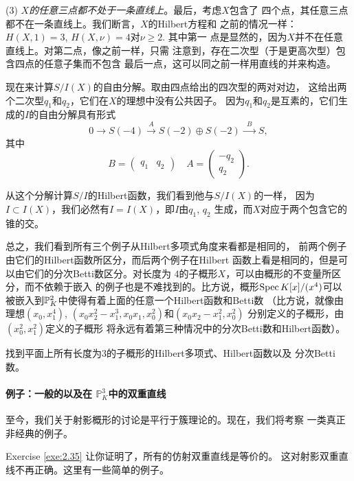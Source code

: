 (3) \textit{$X$的任意三点都不处于一条直线上}。最后，考虑$X$包含了
四个点，其任意三点都不在一条直线上。我们断言，$X$的Hilbert方程和
之前的情况一样：$H(X,1)=3$, $H(X,\nu)=4$对$\nu\geq 2$. 其中第一
点是显然的，因为$X$并不在任意直线上。对第二点，像之前一样，只需
注意到，存在二次型（于是更高次型）包含四点的任意子集而不包含
最后一点，这可以同之前一样用直线的并来构造。

现在来计算$S/I(X)$的自由分解。取由四点给出的四次型的两对对边，
这给出两个二次型$q_1$和$q_2$，它们在$X$的理想中没有公共因子。
因为$q_1$和$q_2$是互素的，它们生成的$I$的自由分解具有形式
\[
	0\longrightarrow S(-4)\xrightarrow{A}
	S(-2)\oplus S(-2)\xrightarrow{\;\;B\;\;} S,
\]
其中
\[
	B=\begin{pmatrix}
	q_1&q_2
	\end{pmatrix}
	\quad
	A=\begin{pmatrix}
	-q_2\\
	q_2
	\end{pmatrix}.
\]

从这个分解计算$S/I$的Hilbert函数，我们看到他与$S/I(X)$的一样，
因为$I\subset I(X)$，我们必然有$I=I(X)$，即$I$由$q_1$, $q_2$
生成，而$X$对应于两个包含它的锥的交。

总之，我们看到所有三个例子从Hilbert多项式角度来看都是相同的，
前两个例子由它们的Hilbert函数所区分，而后两个例子在Hilbert
函数上看是相同的，但是可以由它们的分次Betti数区分。对长度为
$4$的子概形$X$，可以由概形的不变量所区分，而不依赖于嵌入
的例子也是不难找到的。比方说，概形$\spec K[x]/(x^4)$可以
被嵌入到$\P_K^2$中使得有着上面的任意一个Hilbert函数和Betti数
（比方说，就像由理想$(x_0,x_1^4)$, 
$(x_0x_2^2-x_1^3,x_0x_1,x_0^2)$和$(x_0x_2-x_1^2,x_0^2)$
分别定义的子概形，由$(x_0^2,x_1^2)$定义的子概形
将永远有着第三种情况中的分次Betti数和Hilbert函数）。\nottran

\begin{exe}\label{exe:3.63}
找到平面上所有长度为$3$的子概形的Hilbert多项式、Hilbert函数以及
分次Betti数。
\end{exe}

\paragraph*{例子：一般的以及在
\texorpdfstring{$\mathbb P_K^3$}{PK3}中的双重直线}
至今，我们关于射影概形的讨论是平行于簇理论的。现在，我们将考察
一类真正非经典的例子。

Exercise \ref{exe:2.35} 让你证明了，所有的仿射双重直线是等价的。
这对射影双重直线不再正确。这里有一些简单的例子。

